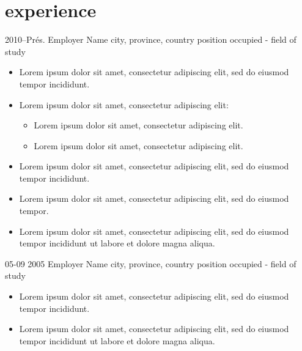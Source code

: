 \documentclass[print]{friggos-cv} %
\begin{document}

\section{experience}

\begin{entrylist}
  \entryBul
    {2010--Prés.}
    {Employer Name}
    {city, province, country}
    {position occupied - field of study}
    {
     \begin{itemize}[leftmargin=*]
       \setlength\itemsep{0pt}
       \item Lorem ipsum dolor sit amet, consectetur adipiscing elit, sed do eiusmod tempor incididunt.                     
       \item Lorem ipsum dolor sit amet, consectetur adipiscing elit:
         \begin{itemize}[leftmargin=0.5cm]
           \item Lorem ipsum dolor sit amet, consectetur adipiscing elit.
           \item Lorem ipsum dolor sit amet, consectetur adipiscing elit.
         \end{itemize}
       \item Lorem ipsum dolor sit amet, consectetur adipiscing elit, sed do eiusmod tempor incididunt.
       \item Lorem ipsum dolor sit amet, consectetur adipiscing elit, sed do eiusmod tempor.
       \item Lorem ipsum dolor sit amet, consectetur adipiscing elit, sed do eiusmod tempor incididunt ut labore et dolore magna aliqua.
     \end{itemize}
     }
\end{entrylist}
\begin{entrylist}
  \entryBul
    {05-09 2005}
    {Employer Name}
    {city, province, country}
    {position occupied - field of study}
    {
     \begin{itemize}[leftmargin=*]
       \setlength\itemsep{0pt}
       \item Lorem ipsum dolor sit amet, consectetur adipiscing elit, sed do eiusmod tempor incididunt.
       \item Lorem ipsum dolor sit amet, consectetur adipiscing elit, sed do eiusmod tempor incididunt ut labore et dolore magna aliqua.
     \end{itemize}
     }
\end{entrylist}
\end{document}
